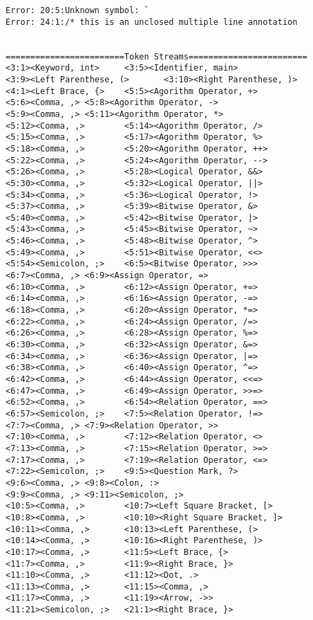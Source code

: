 \documentclass[lang=cn,11pt,a4paper]{paper}
\begin{document}
\begin{lstlisting}
Error: 20:5:Unknown symbol: `
Error: 24:1:/* this is an unclosed multiple line annotation


========================Token Streams========================
<3:1><Keyword, int>     <3:5><Identifier, main>
<3:9><Left Parenthese, (>       <3:10><Right Parenthese, )>
<4:1><Left Brace, {>    <5:5><Agorithm Operator, +>
<5:6><Comma, ,> <5:8><Agorithm Operator, ->
<5:9><Comma, ,> <5:11><Agorithm Operator, *>
<5:12><Comma, ,>        <5:14><Agorithm Operator, />
<5:15><Comma, ,>        <5:17><Agorithm Operator, %>
<5:18><Comma, ,>        <5:20><Agorithm Operator, ++>
<5:22><Comma, ,>        <5:24><Agorithm Operator, -->
<5:26><Comma, ,>        <5:28><Logical Operator, &&>
<5:30><Comma, ,>        <5:32><Logical Operator, ||>
<5:34><Comma, ,>        <5:36><Logical Operator, !>
<5:37><Comma, ,>        <5:39><Bitwise Operator, &>
<5:40><Comma, ,>        <5:42><Bitwise Operator, |>
<5:43><Comma, ,>        <5:45><Bitwise Operator, ~>
<5:46><Comma, ,>        <5:48><Bitwise Operator, ^>
<5:49><Comma, ,>        <5:51><Bitwise Operator, <<>
<5:54><Semicolon, ;>    <6:5><Bitwise Operator, >>>
<6:7><Comma, ,> <6:9><Assign Operator, =>
<6:10><Comma, ,>        <6:12><Assign Operator, +=>
<6:14><Comma, ,>        <6:16><Assign Operator, -=>
<6:18><Comma, ,>        <6:20><Assign Operator, *=>
<6:22><Comma, ,>        <6:24><Assign Operator, /=>
<6:26><Comma, ,>        <6:28><Assign Operator, %=>
<6:30><Comma, ,>        <6:32><Assign Operator, &=>
<6:34><Comma, ,>        <6:36><Assign Operator, |=>
<6:38><Comma, ,>        <6:40><Assign Operator, ^=>
<6:42><Comma, ,>        <6:44><Assign Operator, <<=>
<6:47><Comma, ,>        <6:49><Assign Operator, >>=>
<6:52><Comma, ,>        <6:54><Relation Operator, ==>
<6:57><Semicolon, ;>    <7:5><Relation Operator, !=>
<7:7><Comma, ,> <7:9><Relation Operator, >>
<7:10><Comma, ,>        <7:12><Relation Operator, <>
<7:13><Comma, ,>        <7:15><Relation Operator, >=>
<7:17><Comma, ,>        <7:19><Relation Operator, <=>
<7:22><Semicolon, ;>    <9:5><Question Mark, ?>
<9:6><Comma, ,> <9:8><Colon, :>
<9:9><Comma, ,> <9:11><Semicolon, ;>
<10:5><Comma, ,>        <10:7><Left Square Bracket, [>
<10:8><Comma, ,>        <10:10><Right Square Bracket, ]>
<10:11><Comma, ,>       <10:13><Left Parenthese, (>
<10:14><Comma, ,>       <10:16><Right Parenthese, )>
<10:17><Comma, ,>       <11:5><Left Brace, {>
<11:7><Comma, ,>        <11:9><Right Brace, }>
<11:10><Comma, ,>       <11:12><Dot, .>
<11:13><Comma, ,>       <11:15><Comma, ,>
<11:17><Comma, ,>       <11:19><Arrow, ->>
<11:21><Semicolon, ;>   <21:1><Right Brace, }>


\end{lstlisting}
\end{document}
